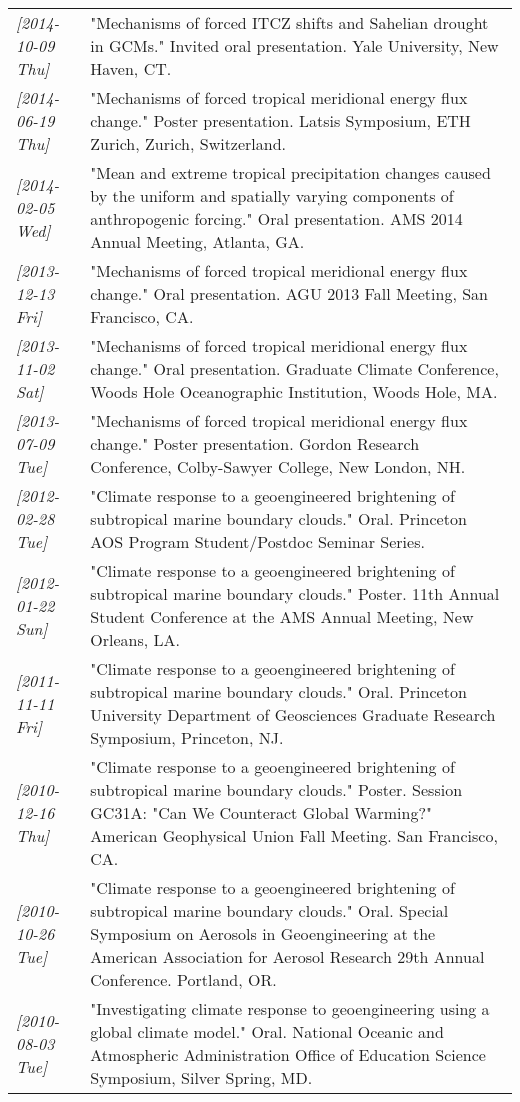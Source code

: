 \documentclass{article}
\begin{document}
\begin{center}
\begin{tabularx}{\textwidth}{lX}
\textit{[2014-10-09 Thu]} & "Mechanisms of forced ITCZ shifts and Sahelian drought in GCMs."  Invited oral presentation.  Yale University, New Haven, CT.\\
\textit{[2014-06-19 Thu]} & "Mechanisms of forced tropical meridional energy flux change."  Poster presentation.  Latsis Symposium, ETH Zurich, Zurich, Switzerland.\\
\textit{[2014-02-05 Wed]} & "Mean and extreme tropical precipitation changes caused by the uniform and spatially varying components of anthropogenic forcing."  Oral presentation.  AMS 2014 Annual Meeting, Atlanta, GA.\\
\textit{[2013-12-13 Fri]} & "Mechanisms of forced tropical meridional energy flux change."  Oral presentation.  AGU 2013 Fall Meeting, San Francisco, CA.\\
\textit{[2013-11-02 Sat]} & "Mechanisms of forced tropical meridional energy flux change."  Oral presentation.  Graduate Climate Conference, Woods Hole Oceanographic Institution, Woods Hole, MA.\\
\textit{[2013-07-09 Tue]} & "Mechanisms of forced tropical meridional energy flux change."  Poster presentation.  Gordon Research Conference, Colby-Sawyer College, New London, NH.\\
\textit{[2012-02-28 Tue]} & "Climate response to a geoengineered brightening of subtropical marine boundary clouds."  Oral.  Princeton AOS Program Student/Postdoc Seminar Series.\\
\textit{[2012-01-22 Sun]} & "Climate response to a geoengineered brightening of subtropical marine boundary clouds."  Poster.  11th Annual Student Conference at the AMS Annual Meeting, New Orleans, LA.\\
\textit{[2011-11-11 Fri]} & "Climate response to a geoengineered brightening of subtropical marine boundary clouds."  Oral.  Princeton University Department of Geosciences Graduate Research Symposium, Princeton, NJ.\\
\textit{[2010-12-16 Thu]} & "Climate response to a geoengineered brightening of subtropical marine boundary clouds."  Poster.  Session GC31A: "Can We Counteract Global Warming?" American Geophysical Union Fall Meeting.  San Francisco, CA.\\
\textit{[2010-10-26 Tue]} & "Climate response to a geoengineered brightening of subtropical marine boundary clouds."  Oral.  Special Symposium on Aerosols in Geoengineering at the American Association for Aerosol Research 29th Annual Conference.  Portland, OR.\\
\textit{[2010-08-03 Tue]} & "Investigating climate response to geoengineering using a global climate model."  Oral.  National Oceanic and Atmospheric Administration Office of Education Science Symposium, Silver Spring, MD.\\
\end{tabularx}
\end{center}
\end{document}
